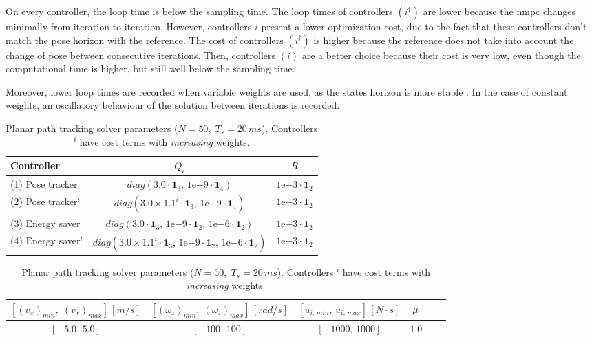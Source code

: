 On every controller, the loop time is below the sampling time. The loop times of controllers $(i^{\dagger})$ are lower because the \acrshort{nmpc} changes minimally from iteration to iteration. However, controllers $i$ present a lower optimization cost, due to the fact that these controllers don't match the pose horizon with the reference. The cost of controllers $(i^{\dagger})$ is higher because the reference does not take into account the change of pose between consecutive iterations. Then, controllers $(i)$ are a better choice because their cost is very low, even though the computational time is higher, but still well below the sampling time.

Moreover, lower loop times are recorded when variable weights are used, as the states horizon is more stable \cite{schoels2020nmpc}. In the case of constant weights, an oscillatory behaviour of the solution between iterations is recorded.

\begin{table}[!htb]
  \caption[Planar path tracking solver parameters ($N = 50,\; T_s = 20\,ms$). Controllers $^i$ have cost terms with \textit{increasing} weights.]{Planar path tracking solver parameters ($N = 50,\; T_s = 20\,ms$). Controllers $^i$ have cost terms with \textit{increasing} weights.}
  \label{tab:pathTrackingSpecs}
  \renewcommand{\arraystretch}{1.1}
  \centering
  \begin{tabular}[]{lcc}
	\toprule
	Controller & $Q_i$ & $R$\\
	\midrule
	(1) Pose tracker & $diag\left(3.0 \cdot \mathbf{1}_3,\,1\mathrm{e}{-9} \cdot \mathbf{1}_4\right)$ & $1\mathrm{e}{-3}\cdot \mathbf{1}_2$\\
	(2) Pose tracker$^i$ & $diag\left(3.0 \times 1.1^i \cdot \mathbf{1}_3,\,1\mathrm{e}{-9} \cdot \mathbf{1}_4\right)$ & $1\mathrm{e}{-3}\cdot \mathbf{1}_2$\\
	(3) Energy saver & $diag\left(3.0 \cdot \mathbf{1}_3,\,1\mathrm{e}{-9}\cdot\mathbf{1}_2,\,1\mathrm{e}{-6}\cdot\mathbf{1}_2\right)$ & $1\mathrm{e}{-3}\cdot\mathbf{1}_2$\\
	(4) Energy saver$^i$ & $diag\left(3.0\times 1.1^i \cdot \mathbf{1}_3,\,1\mathrm{e}{-9} \cdot \mathbf{1}_2,\,1\mathrm{e}{-6}\cdot\mathbf{1}_2\right)$ & $1\mathrm{e}{-3}\cdot \mathbf{1}_2$\\
	\end{tabular}
	\begin{tabular}[]{cccccc}
  	\toprule
  		$\left[(v_x)_{min},\; (v_x)_{max}\right]\,[m/s]$ & $\left[(\omega_z)_{min},\; (\omega_z)_{max}\right]\,[rad/s]$ & $\left[u_{i,\,min},\,u_{i,\,max}\right]\,[N \cdot s]$ & $\mu$\\
  	\midrule
  		$\left[-5.0,\,5.0\right]$ & $\left[-100,\,100\right]$ & $\left[-1000,\,1000\right]$ & $1.0$\\
  	\bottomrule
  \end{tabular}
\end{table}

